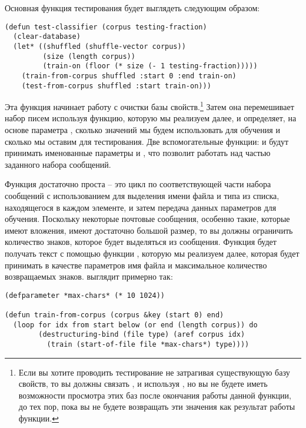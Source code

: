 Основная функция тестирования будет выглядеть следующим образом:

\begin{lstlisting}
(defun test-classifier (corpus testing-fraction)
  (clear-database)
  (let* ((shuffled (shuffle-vector corpus))
         (size (length corpus))
         (train-on (floor (* size (- 1 testing-fraction)))))
    (train-from-corpus shuffled :start 0 :end train-on)
    (test-from-corpus shuffled :start train-on)))
\end{lstlisting}

Эта функция начинает работу с очистки базы свойств.\footnote{Если вы хотите проводить
  тестирование не затрагивая существующую базу свойств, то вы должны связать
  ,  и  используя
  , но вы не будете иметь возможности просмотра этих баз после окончания работы
  данной функции, до тех пор, пока вы не будете возвращать эти значения как результат
  работы функции.}  Затем она перемешивает набор писем используя функцию, которую мы
реализуем далее, и определяет, на основе параметра , сколько
значений мы будем использовать для обучения и сколько мы оставим для тестирования.  Две
вспомогательные функции:  и  будут
принимать именованные параметры  и , что позволит работать над
частью заданного набора сообщений.

Функция  достаточно проста -- это цикл по соответствующей части
набора сообщений с использованием  для выделения имени файла и
типа из списка, находящегося в каждом элементе, и затем передача данных параметров для
обучения.  Поскольку некоторые почтовые сообщения, особенно такие, которые имеют вложения,
имеют достаточно большой размер, то вы должны ограничить количество знаков, которое будет
выделяться из сообщения.  Функция будет получать текст с помощью функции
, которую мы реализуем далее, которая будет принимать в качестве
параметров имя файла и максимальное количество возвращаемых знаков.
 выглядит примерно так:

\begin{lstlisting}
(defparameter *max-chars* (* 10 1024))

(defun train-from-corpus (corpus &key (start 0) end)
  (loop for idx from start below (or end (length corpus)) do
        (destructuring-bind (file type) (aref corpus idx)
          (train (start-of-file file *max-chars*) type))))
\end{lstlisting}

